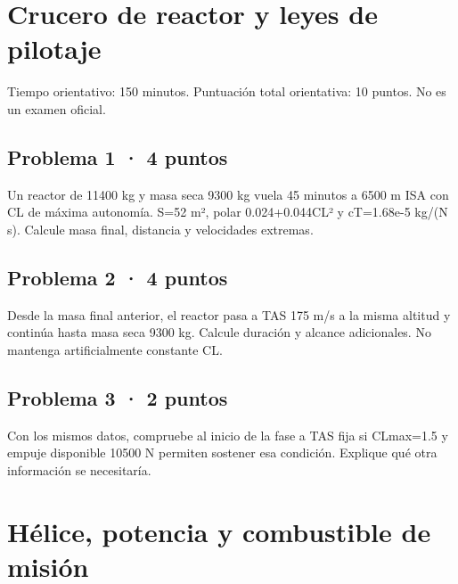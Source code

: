 \chapter{Crucero de reactor y leyes de pilotaje}

Tiempo orientativo: 150 minutos. Puntuación total orientativa: 10 puntos. No es un examen oficial.

\section{Problema 1 · 4 puntos}

Un reactor de 11400 kg y masa seca 9300 kg vuela 45 minutos a 6500 m ISA con CL de máxima autonomía. S=52 m², polar 0.024+0.044CL² y cT=1.68e-5 kg/(N s). Calcule masa final, distancia y velocidades extremas.


\section{Problema 2 · 4 puntos}

Desde la masa final anterior, el reactor pasa a TAS 175 m/s a la misma altitud y continúa hasta masa seca 9300 kg. Calcule duración y alcance adicionales. No mantenga artificialmente constante CL.


\section{Problema 3 · 2 puntos}

Con los mismos datos, compruebe al inicio de la fase a TAS fija si CLmax=1.5 y empuje disponible 10500 N permiten sostener esa condición. Explique qué otra información se necesitaría.


\chapter{Hélice, potencia y combustible de misión}

